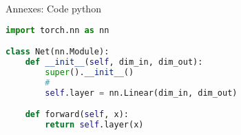 \documentclass[12pt]{beamer}
\begin{document}
\begin{frame}[fragile]{Annexes: Code python}
\footnotesize
\begin{tcolorbox}[colback=white,boxsep=2mm,arc=1pt,
    auto outer arc,left=1mm,right=1mm,top=1mm,bottom=1mm,boxrule=0.5pt,width=\textwidth]
\begin{lstlisting}[language=python]
import torch.nn as nn

class Net(nn.Module):  
    def __init__(self, dim_in, dim_out):
        super().__init__()
        #
        self.layer = nn.Linear(dim_in, dim_out)

    def forward(self, x):
        return self.layer(x)
\end{lstlisting}
\end{tcolorbox}
\normalsize
\end{frame}



\end{document}
